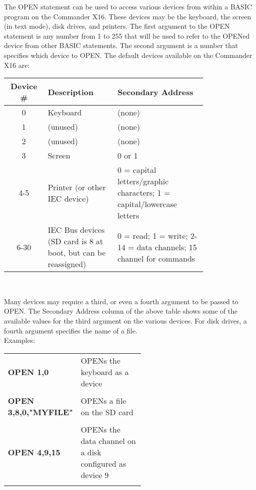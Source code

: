 The {\ttfamily OPEN} statement can be used to access various devices from
within a BASIC program on the Commander X16.  These devices may be the
keyboard, the screen (in text mode), disk drives, and printers.  The first
argument to the {\ttfamily OPEN} statement is any number from 1 to 255 that
will be used to refer to the {\ttfamily OPEN}ed device from other BASIC
statements.  The second argument is a number that specifies which device to
{\ttfamily OPEN}.  The default devices available on the Commander X16 are:\\

\begin{tabular}{|c|p{0.35\linewidth}|p{0.45\linewidth}|}
	\hline
	{\bfseries Device \#} & {\bfseries Description} & {\bfseries Secondary Address}\\ \hline

	0 & Keyboard & (none)\\ \hline

	1 & (unused) & (none)\\ \hline

	2 & (unused) & (none)\\ \hline

	3 & Screen & 0 or 1\\ \hline

	4-5 & Printer (or other IEC device) & 0 = capital letters/graphic characters; 1 = capital/lowercase letters\\ \hline

	6-30 & IEC Bus devices (SD card is 8 at boot, but can be reassigned) & 0 = read; 1 = write; 2-14
	= data channels; 15 channel for commands\\ \hline

\end{tabular}\\

\vspace{16pt}

Many devices may require a third, or even a fourth argument to be passed to
{\ttfamily OPEN}.  The Secondary Address column of the above table shows some
of the available values for the third argument on the various devices.  For
disk drives, a fourth argument specifies the name of a file.\\


Examples:\\

\begin{tabular}{l p{0.55\linewidth}}

	{\ttfamily\bfseries OPEN 1,0} & {\ttfamily OPEN}s the keyboard as a device\\\\

	{\ttfamily\bfseries OPEN 3,8,0,"MYFILE"} & {\ttfamily OPEN}s a file on the SD card\\\\

	{\ttfamily\bfseries OPEN 4,9,15} & {\ttfamily OPEN}s the data channel on a disk configured as device 9\\\\

\end{tabular}


